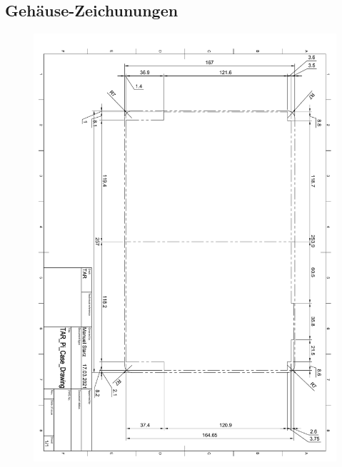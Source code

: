 \subsection{Gehäuse-Zeichunungen}
\begin{figure}[ht!]
	\includegraphics*[width=1\textwidth, page=1]{pdf/gehäuse_zeichnung_fußabdruck.pdf}
 	\label{case_footprint}
\end{figure}
\newpage